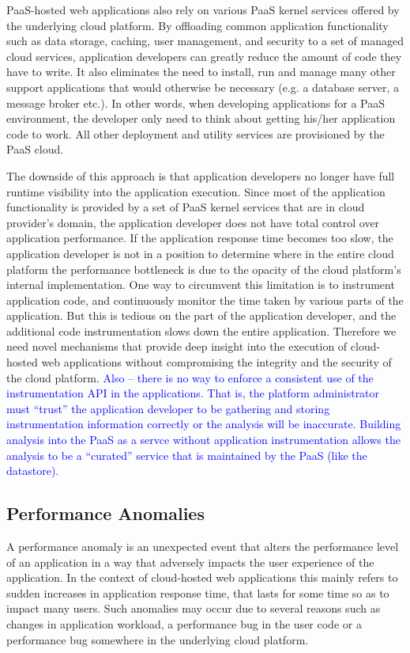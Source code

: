 PaaS-hosted web applications also rely on various PaaS kernel services offered by the underlying
cloud platform. By offloading common application functionality such as data storage, caching,
user management, and security to a set of managed cloud services, application developers
can greatly reduce the amount of code they have to write. It also eliminates the need to install, run and
manage many other support applications that would otherwise be necessary (e.g. a database server, 
a message broker etc.). In other words, when developing applications for a PaaS environment, the
developer only need to think about getting his/her application code to work. All other deployment
and utility services are provisioned by the PaaS cloud. 

The downside of this approach is that application developers no longer have full runtime visibility
into the application execution. Since most of the application functionality is provided by a set 
of PaaS kernel services that are in cloud provider's domain, the application
developer does not have total control over application performance. If the application 
response time becomes too slow, the application developer is not in a position to determine
where in the entire cloud platform the performance bottleneck is due to the opacity of the cloud
platform's internal implementation. One way to circumvent this 
limitation is to instrument application code, and continuously monitor the time taken by various
parts of the application. But this is tedious on the part of the application developer, and
the additional code instrumentation slows down the entire application. Therefore we need
novel mechanisms that provide deep insight into the execution of cloud-hosted web
applications without compromising the integrity and the security of the cloud platform.
\textcolor{blue}{Also -- there is no way to enforce a consistent use of the
instrumentation API in the applications.  That is, the platform administrator
must ``trust'' the application developer to be gathering and storing 
instrumentation information correctly or the analysis will be inaccurate.
Building analysis into the PaaS as a servce without application
instrumentation allows the analysis to be a ``curated'' service that is
maintained by the PaaS (like the datastore).}

\subsection{Performance Anomalies}

A performance anomaly is an unexpected event that alters the performance level of an
application in a way that adversely impacts the user experience of the application. In the context
of cloud-hosted web applications this mainly refers to sudden increases in application
response time, that lasts for some time so as to impact many users. Such anomalies 
may occur due to several reasons such as changes in
application workload, a performance bug in the user code or a performance bug somewhere
in the underlying cloud platform.

